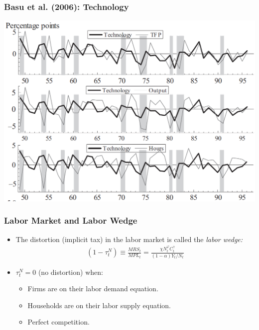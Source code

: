 \documentclass[english,xcolor=svgnames]{beamer}
\begin{document}
\begin{frame}
\frametitle{Basu et al. (2006): Technology}
\centering
\includegraphics[scale=0.6]{../../Images/BFK2006Technology.png}	
\end{frame}

 
\begin{frame}
\frametitle{Labor Market and Labor Wedge
}
\begin{itemize}
	\item The distortion (implicit tax) in the labor market is called the \emph{labor wedge:}
	\begin{align*}
		(1-\tau_t^N)\equiv\frac{MRS_t}{MPL_t}=\frac{\chi N_t^\varphi C_t^{\gamma}}{(1-\alpha)Y_t/N_t}
	\end{align*}
	\item $\tau_t^N=0$ (no distortion) when:
	\begin{itemize}
		\item Firms are on their labor demand equation.
		\item Households are on their labor supply equation.
		\item Perfect competition.
	\end{itemize}
\end{itemize}

\end{frame}
\end{document}

